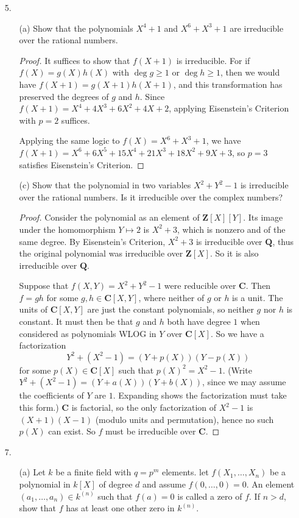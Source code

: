 \documentclass[10pt]{article}
\newcommand{\Q}{\mathbf{Q}}
\newcommand{\Z}{\mathbf{Z}}
\newcommand{\C}{\mathbf{C}}
\begin{document}
\begin{enumerate}
\item[5.]
\begin{enumerate}
\item[(a)] Show that the polynomials $X^4 + 1$ and $X^6 + X^3 + 1$ are irreducible over the rational numbers.

\begin{proof}
It suffices to show that $f(X+1)$ is irreducible.   For if $f(X) = g(X)h(X)$ with $\deg g \geq 1$ or $\deg h \geq 1$, then we would have $f(X+1) = g(X+1)h(X+1)$, and this transformation has preserved the degrees of $g$ and $h$.  Since $f(X+1) = X^4 + 4X^3 + 6X^2 + 4X + 2$, applying Eisenstein's Criterion with $p = 2$ suffices.

Applying the same logic to $f(X) = X^6 + X^3 + 1$, we have $f(X+1) = X^6+6 X^5+15 X^4+21 X^3+18 X^2+9 X+3$, so $p=3$ satisfies Eisenstein's Criterion.
\end{proof}

\item[(c)] Show that the polynomial in two variables $X^2 + Y^2 - 1$ is irreducible over the rational numbers.  Is it irreducible over the complex numbers?

\begin{proof}
Consider the polynomial as an element of $\Z[X][Y]$.  Its image under the homomorphism $Y \mapsto 2$ is $X^2 + 3$, which is nonzero and of the same degree.  By Eisenstein's Criterion, $X^2 + 3$ is irreducible over $\Q$, thus the original polynomial was irreducible over $\Z[X]$.  So it is also irreducible over $\Q$.

Suppose that $f(X,Y) = X^2 + Y^2 - 1$ were reducible over $\C$.  Then $f = gh$ for some $g,h \in \C[X,Y]$, where neither of $g$ or $h$ is a unit.  The units of $\C[X,Y]$ are just the constant polynomials, so neither $g$ nor $h$ is constant.  It must then be that $g$ and $h$ both have degree $1$ when considered as polynomials WLOG in $Y$ over $\C[X]$.  So we have a factorization
$$
Y^2 + (X^2 - 1) = (Y + p(X))(Y - p(X))
$$
for some $p(X) \in \C[X]$ such that $p(X)^2 = X^2 - 1$.  (Write $Y^2 + (X^2 - 1) = (Y + a(X))(Y + b(X))$, since we may assume the coefficients of $Y$ are $1$.  Expanding shows the factorization must take this form.)  $\C$ is factorial, so the only factorization of $X^2 - 1$ is $(X+1)(X-1)$ (modulo units and permutation), hence no such $p(X)$ can exist.  So $f$ must be irreducible over $\C$.
\end{proof}

\end{enumerate}
\item[7.]
\begin{enumerate}
\item[(a)] Let $k$ be a finite field with $q = p^m$ elements.  let $f(X_1, \dots , X_n)$ be a polynomial in $k[X]$ of degree $d$ and assume $f(0,\dots,0) = 0$.  An element $(a_1, \dots , a_n) \in k^{(n)}$ such that $f(a) = 0$ is called a zero of $f$.  If $n>d$, show that $f$ has at least one other zero in $k^{(n)}$.


\end{enumerate}
\end{enumerate}
\end{document}

